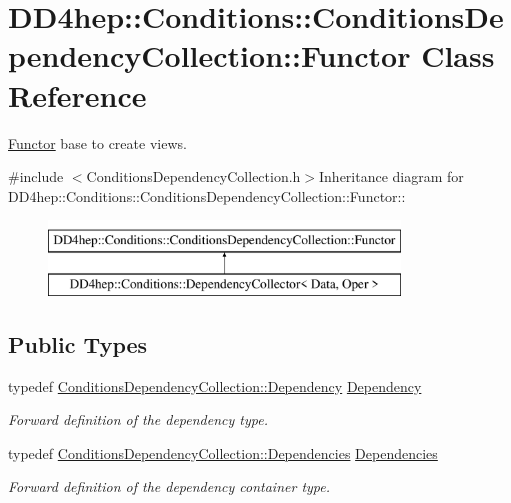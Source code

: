 \hypertarget{class_d_d4hep_1_1_conditions_1_1_conditions_dependency_collection_1_1_functor}{
\section{DD4hep::Conditions::ConditionsDependencyCollection::Functor Class Reference}
\label{class_d_d4hep_1_1_conditions_1_1_conditions_dependency_collection_1_1_functor}
}


\hyperlink{class_d_d4hep_1_1_conditions_1_1_conditions_dependency_collection_1_1_functor}{Functor} base to create views.  


{\ttfamily \#include $<$ConditionsDependencyCollection.h$>$}Inheritance diagram for DD4hep::Conditions::ConditionsDependencyCollection::Functor::\begin{figure}[H]
\begin{center}
\leavevmode
\includegraphics[height=2cm]{class_d_d4hep_1_1_conditions_1_1_conditions_dependency_collection_1_1_functor}
\end{center}
\end{figure}
\subsection*{Public Types}
\begin{DoxyCompactItemize}
\item 
typedef \hyperlink{class_d_d4hep_1_1_conditions_1_1_condition_dependency}{ConditionsDependencyCollection::Dependency} \hyperlink{class_d_d4hep_1_1_conditions_1_1_conditions_dependency_collection_1_1_functor_af969f8adeb10039bf5d5d2b2751fc45b}{Dependency}
\begin{DoxyCompactList}\small\item\em Forward definition of the dependency type. \item\end{DoxyCompactList}\item 
typedef \hyperlink{class_d_d4hep_1_1_conditions_1_1_conditions_dependency_collection_a7fb4072b6036f59389b929e312e2679c}{ConditionsDependencyCollection::Dependencies} \hyperlink{class_d_d4hep_1_1_conditions_1_1_conditions_dependency_collection_1_1_functor_adaf7b6e0ec9fa1b67ee3b24924780152}{Dependencies}
\begin{DoxyCompactList}\small\item\em Forward definition of the dependency container type. \item\end{DoxyCompactList}\end{DoxyCompactItemize}


